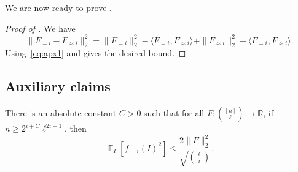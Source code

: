 \documentclass{toc}
\newcommand\Expect[2]{{\mathop{\mathbb{E}}_{#1}\left[ {#2} \right]}}
\newcommand\norm[1]{\| #1 \|}
\newcommand\inner[2]{\langle{#1},{#2}\rangle}
\renewcommand\geq{\geqslant}
\renewcommand\leq{\leqslant}
\newcommand\lvlfn[2]{{#1}_{={#2}}}
\newcommand\approxlvlfn[2]{{#1}_{\approx{#2}}}
\begin{document}
We are now ready to prove .
\begin{proof}[Proof of ]
  We have
  \[
  \norm{\lvlfn{F}{i} - \approxlvlfn{F}{i}}_2^2
  =\norm{\lvlfn{F}{i}}_2^2 - \inner{\lvlfn{F}{i}}{\approxlvlfn{F}{i}}
  +\norm{\approxlvlfn{F}{i}}_2^2 - \inner{\lvlfn{F}{i}}{\approxlvlfn{F}{i}}.
  \]
  Using~\eqref{eq:apx1} and  gives the desired bound.
\end{proof}

\subsection{Auxiliary claims}
\begin{claim}\label{claim:mock_parseval}
  There is an absolute constant $C>0$ such that for all $F\colon \binom{[n]}{\ell}\to\mathbb{R}$, if $n\geq 2^{i+C} \ell^{2i+1}$, then
  \[
  \Expect{I}{\lvlfn{f}{i}(I)^2}\leq \frac{2\norm{F}_2^2}{\sqrt{\ell\choose i}}.
  \]
\end{claim}
\end{document}
